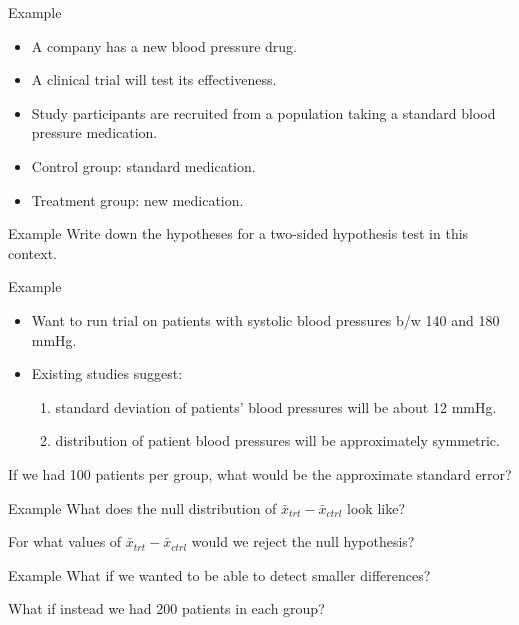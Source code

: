 \begin{frame}{Example}
    \begin{itemize}
        \item A company has a new blood pressure drug.
        \item A clinical trial will test its effectiveness.
        \item Study participants are recruited from a population taking a standard blood pressure medication.
        \item Control group: standard medication.
        \item Treatment group: new medication.
    \end{itemize}
\end{frame}

\begin{frame}{Example}
    Write down the hypotheses for a two-sided hypothesis test in this context.
\end{frame}

\begin{frame}{Example}
    \begin{itemize}
        \item Want to run trial on patients with systolic blood pressures b/w 140 and 180 mmHg.
        \item Existing studies suggest:
        \begin{enumerate}
            \item standard deviation of patients’ blood pressures will be about 12 mmHg.
            \item distribution of patient blood pressures will be approximately symmetric.
        \end{enumerate}
    \end{itemize}
    If we had 100 patients per group, what would be the approximate standard error?
\end{frame}

\begin{frame}{Example}
    What does the null distribution of $\bar{x}_{trt} − \bar{x}_{ctrl}$ look like?
    
    \vspace{24pt}
    For what values of $\bar{x}_{trt} − \bar{x}_{ctrl}$ would we reject the null hypothesis?
\end{frame}

\begin{frame}{Example}
    What if we wanted to be able to detect smaller differences?
    
    \vspace{24pt}What if instead we had 200 patients in each group?
\end{frame}

